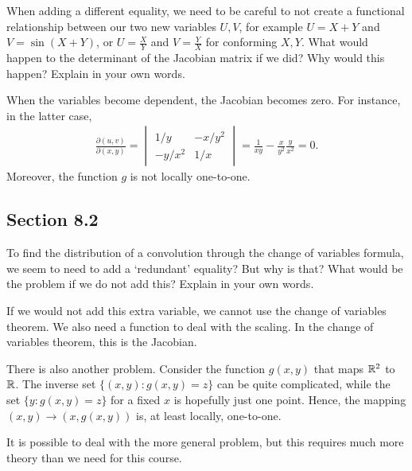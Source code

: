 \begin{exercise}
When adding a different equality, we need to be careful to not create a functional relationship between our two new variables $U,V$, for example $U=X+Y$ and $V=\sin(X+Y)$, or $U=\frac X Y$ and $V = \frac Y X$ for conforming $X,Y$.
What would happen to the determinant of the Jacobian matrix if we did?
Why would this happen?
Explain in your own words.
\begin{solution}
  When the variables become dependent, the Jacobian becomes zero. For instance,  in the latter case,
\begin{align}
\frac{\partial (u,v)}{\partial (x, y)} =
  \begin{vmatrix}
    1/y & -x/y^{2} \\
-y/x^{2} & 1/x
  \end{vmatrix} = \frac{1}{x y} - \frac{x}{y^2}\frac{y}{x^{2}} = 0.
\end{align}
Moreover, the function $g$ is not locally one-to-one.

\end{solution}
\end{exercise}


\subsection*{Section 8.2}
\label{sec:section-8.2}


\begin{exercise}
To find the distribution of a convolution through the change of variables formula, we seem to need to add a `redundant' equality?
But why is that?
What would be the problem if we do not add this?
Explain in your own words.
\begin{solution}
If we would not add this extra variable, we cannot use the change of variables theorem. We also need a function to deal with the scaling. In the change of variables theorem, this is the Jacobian.

There is also another problem.
Consider the function $g(x, y)$ that maps $\mathbb{R}^{2}$ to $\mathbb{R}$.
The inverse set $\{ (x,y) : g(x,y) =z \}$ can be quite complicated, while the set $\{y : g(x, y) = z\}$ for a fixed $x$ is hopefully just one point.
Hence, the mapping $(x, y) \to (x, g(x,y))$ is, at least locally, one-to-one.

It is possible to deal with the more general problem, but this requires much more theory than we need for this course.
\end{solution}
\end{exercise}


